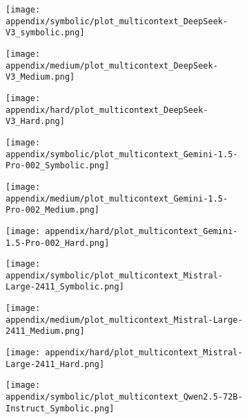 \begin{figure}[h!]
  \centering
  \begin{subfigure}{0.17\textwidth}
    \texttt{[image: appendix/symbolic/plot\_multicontext\_DeepSeek-V3\_symbolic.png]}
  \end{subfigure}
  \hfill
  \begin{subfigure}{0.17\textwidth}
    \texttt{[image: appendix/medium/plot\_multicontext\_DeepSeek-V3\_Medium.png]}
  \end{subfigure}
  \hfill
  \begin{subfigure}{0.17\textwidth}
    \texttt{[image: appendix/hard/plot\_multicontext\_DeepSeek-V3\_Hard.png]}
  \end{subfigure}
  \hfill
  \begin{subfigure}{0.17\textwidth}
    \texttt{[image: appendix/symbolic/plot\_multicontext\_Gemini-1.5-Pro-002\_Symbolic.png]}
  \end{subfigure}
  \hfill
  \begin{subfigure}{0.17\textwidth}
    \texttt{[image: appendix/medium/plot\_multicontext\_Gemini-1.5-Pro-002\_Medium.png]}
  \end{subfigure}
  \hfill
  \begin{subfigure}{0.17\textwidth}
    \texttt{[image: appendix/hard/plot\_multicontext\_Gemini-1.5-Pro-002\_Hard.png]}
  \end{subfigure}
  \hfill
  \begin{subfigure}{0.17\textwidth}
    \texttt{[image: appendix/symbolic/plot\_multicontext\_Mistral-Large-2411\_Symbolic.png]}
  \end{subfigure}
  \hfill
  \begin{subfigure}{0.17\textwidth}
    \texttt{[image: appendix/medium/plot\_multicontext\_Mistral-Large-2411\_Medium.png]}
  \end{subfigure}
  \hfill
  \begin{subfigure}{0.17\textwidth}
    \texttt{[image: appendix/hard/plot\_multicontext\_Mistral-Large-2411\_Hard.png]}
  \end{subfigure}
  \hfill
  \begin{subfigure}{0.17\textwidth}
    \texttt{[image: appendix/symbolic/plot\_multicontext\_Qwen2.5-72B-Instruct\_Symbolic.png]}
  \end{subfigure}
  \hfill
  \begin{subfigure}{0.17\textwidth}

\end{subfigure}
\end{figure}
